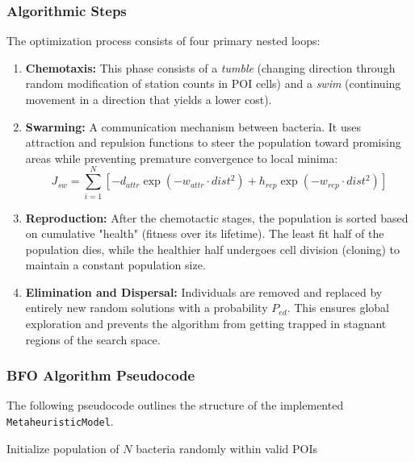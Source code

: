 \documentclass{article}
\begin{document}
\subsubsection{Algorithmic Steps}
The optimization process consists of four primary nested loops:
\begin{enumerate}
    \item \textbf{Chemotaxis:} This phase consists of a \textit{tumble} (changing direction through random modification of station counts in POI cells) and a \textit{swim} (continuing movement in a direction that yields a lower cost).
    \item \textbf{Swarming:} A communication mechanism between bacteria. It uses attraction and repulsion functions to steer the population toward promising areas while preventing premature convergence to local minima:
    \begin{equation}
        J_{sw} = \sum_{i=1}^N \left[ -d_{attr} \exp(-w_{attr} \cdot dist^2) + h_{rep} \exp(-w_{rep} \cdot dist^2) \right]
    \end{equation}
    \item \textbf{Reproduction:} After the chemotactic stages, the population is sorted based on cumulative "health" (fitness over its lifetime). The least fit half of the population dies, while the healthier half undergoes cell division (cloning) to maintain a constant population size.
    \item \textbf{Elimination and Dispersal:} Individuals are removed and replaced by entirely new random solutions with a probability $P_{ed}$. This ensures global exploration and prevents the algorithm from getting trapped in stagnant regions of the search space.
\end{enumerate}

\subsubsection{BFO Algorithm Pseudocode}
The following pseudocode outlines the structure of the implemented \texttt{MetaheuristicModel}.

\begin{algorithm}[H]
\SetAlgoLined
{}
Initialize population of $N$ bacteria randomly within valid POIs\;
\caption{Bacterial Foraging Optimization for EVCSP}
\end{algorithm}
\end{document}
